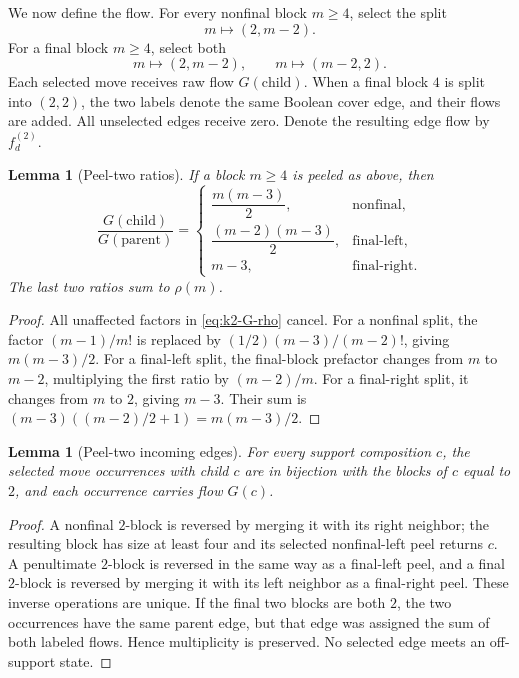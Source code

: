 \documentclass[11pt]{amsart}
\newtheorem{lemma}[theorem]{Lemma}
\theoremstyle{definition}
\theoremstyle{remark}
\begin{document}
We now define the flow.  For every nonfinal block $m\ge4$, select the
split
\[
 m\longmapsto(2,m-2).
\]
For a final block $m\ge4$, select both
\[
 m\longmapsto(2,m-2),\qquad m\longmapsto(m-2,2).
\]
Each selected move receives raw flow $G(\text{child})$.  When a final
block $4$ is split into $(2,2)$, the two labels denote the same Boolean
cover edge, and their flows are added.  All unselected edges receive zero.
Denote the resulting edge flow by $f^{(2)}_d$.

\begin{lemma}[Peel-two ratios]
\label{lem:k2-ratios}
If a block $m\ge4$ is peeled as above, then
\[
 \frac{G(\text{child})}{G(\text{parent})}=
 \begin{cases}
  \dfrac{m(m-3)}2,&\text{nonfinal},\\[5pt]
  \dfrac{(m-2)(m-3)}2,&\text{final-left},\\[5pt]
  m-3,&\text{final-right}.
 \end{cases}
\]
The last two ratios sum to $\rho(m)$.
\end{lemma}

\begin{proof}
All unaffected factors in \eqref{eq:k2-G-rho} cancel.  For a nonfinal
split, the factor $(m-1)/m!$ is replaced by
$(1/2)(m-3)/(m-2)!$, giving $m(m-3)/2$.  For a final-left split, the
final-block prefactor changes from $m$ to $m-2$, multiplying the first
ratio by $(m-2)/m$.  For a final-right split, it changes from $m$ to
$2$, giving $m-3$.  Their sum is
$(m-3)((m-2)/2+1)=m(m-3)/2$.
\end{proof}

\begin{lemma}[Peel-two incoming edges]
\label{lem:k2-incoming}
For every support composition $c$, the selected move occurrences with
child $c$ are in bijection with the blocks of $c$ equal to $2$, and
each occurrence carries flow $G(c)$.
\end{lemma}

\begin{proof}
A nonfinal $2$-block is reversed by merging it with its right neighbor;
the resulting block has size at least four and its selected nonfinal-left
peel returns $c$.  A penultimate $2$-block is reversed in the same way
as a final-left peel, and a final $2$-block is reversed by merging it with
its left neighbor as a final-right peel.  These inverse operations are
unique.  If the final two blocks are both $2$, the two occurrences have
the same parent edge, but that edge was assigned the sum of both labeled
flows.  Hence multiplicity is preserved.  No selected edge meets an
off-support state.
\end{proof}
\end{document}

